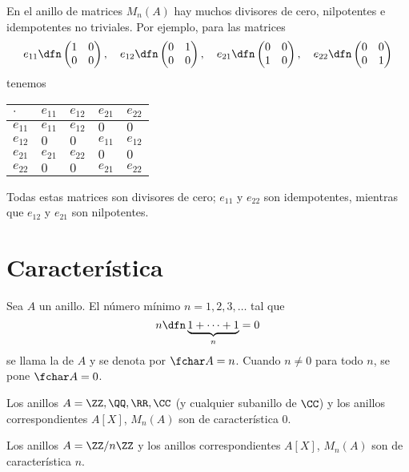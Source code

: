 \begin{ejemplo}
  En el anillo de matrices $M_n (A)$ hay muchos divisores de cero, nilpotentes e
  idempotentes no triviales. Por ejemplo, para las matrices
  \[ e_{11} \dfn \begin{pmatrix}
      1 & 0 \\
      0 & 0
    \end{pmatrix}, \quad
    e_{12} \dfn \begin{pmatrix}
      0 & 1 \\
      0 & 0
    \end{pmatrix}, \quad
    e_{21} \dfn \begin{pmatrix}
      0 & 0 \\
      1 & 0
    \end{pmatrix}, \quad
    e_{22} \dfn \begin{pmatrix}
      0 & 0 \\
      0 & 1
    \end{pmatrix} \]
  tenemos
  \begin{center}
    \begin{tabular}{f{1cm}|f{1cm}f{1cm}f{1cm}f{1cm}}
      $\cdot$ & $e_{11}$ & $e_{12}$ & $e_{21}$ & $e_{22}$ \tabularnewline
      \hline
      $e_{11}$ & $e_{11}$ & $e_{12}$ & $0$ & $0$ \tabularnewline
      $e_{12}$ & $0$ & $0$ & $e_{11}$ & $e_{12}$ \tabularnewline
      $e_{21}$ & $e_{21}$ & $e_{22}$ & $0$ & $0$ \tabularnewline
      $e_{22}$ & $0$ & $0$ & $e_{21}$ & $e_{22}$ \tabularnewline
    \end{tabular}
  \end{center}
  Todas estas matrices son divisores de cero; $e_{11}$ y $e_{22}$ son
  idempotentes, mientras que $e_{12}$ y $e_{21}$ son nilpotentes.
\end{ejemplo}


\section{Característica}

\begin{definicion}
  Sea $A$ un anillo. El número mínimo $n = 1,2,3,\ldots$ tal que
  $$n \dfn \underbrace{1 + \cdots + 1}_n = 0$$
  se llama la  de $A$ y se denota por
  $\fchar A = n$. Cuando $n \ne 0$ para todo $n$, se pone $\fchar A = 0$.
\end{definicion}

\begin{ejemplo}
  Los anillos $A = \ZZ, \QQ, \RR, \CC$ (y cualquier subanillo de $\CC$) y los
  anillos correspondientes $A [X]$, $M_n (A)$ son de característica $0$.

  Los anillos $A = \ZZ/n\ZZ$ y los anillos correspondientes $A [X]$, $M_n (A)$
  son de característica $n$.
\end{ejemplo}

